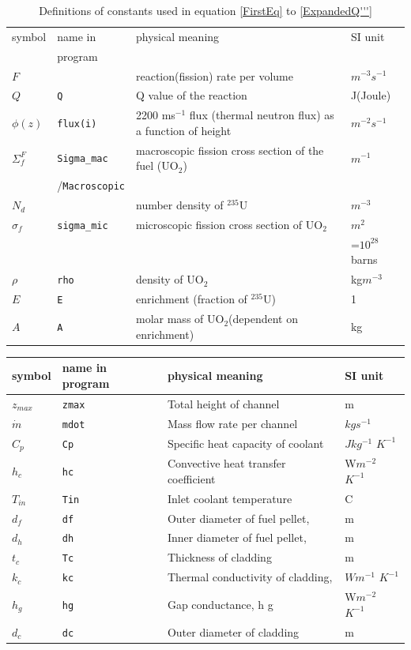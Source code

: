 \documentclass[a4paper, 12pt]{article}
\begin{document}
\newpage
\begin{appendices} 
	
\begin{table}[h!b]
\begin{tabular}{llll}
\hline
symbol&name in&physical meaning & SI unit\\
&program&&\\
\hline
\hline
$F$		&& reaction(fission) rate per volume							&$m^{-3}s^{-1}$\\
$Q$ 	&\texttt{Q}&Q value of the reaction 											&J(Joule)\\
$\phi(z)$&\texttt{flux(i)}& 2200 ms${}^{-1}$ flux (thermal neutron flux) as a function of height &$m^{-2}s^{-1}$\\
$\Sigma_f^F$&\texttt{Sigma\_mac}& macroscopic fission cross section of the fuel (UO${}_2$)		&$m^{-1}$\\
&/\texttt{Macroscopic}&&\\
$N_d$ 	&& number density of ${}^{235}$U 									&$m^{-3}$\\
$\sigma_f$&\texttt{sigma\_mic}& microscopic fission cross section of UO${}_2$	&$m^{2}$\\
&&&=$10^{28}$barns\\
$\rho $ &\texttt{rho}& density of UO${}_2$											&kg$m^{-3}$\\
$E$ 	&\texttt{E}& enrichment (fraction of ${}^{235}$U)								&1\\
$A$ 	&\texttt{A}& molar mass of UO${}_2$(dependent on enrichment)					&kg\\
\hline
\end{tabular}
\caption{Definitions of constants used in equation \ref{FirstEq} to \ref{ExpandedQ'''} }\label{table1}
\end{table}

\begin{table}[h!b]
\begin{tabular}{llll}

\hline
symbol&name in program&physical meaning & SI unit\\
\hline
$z_{max}$&\texttt{zmax}&Total height of channel 				&m\\
$\dot{m}$&\texttt{mdot}&Mass flow rate per channel 		&$kgs^{-1}$ \\
$C_p$	&\texttt{Cp}&Specific heat capacity of coolant 		&$Jkg^{-1}$ $K^{-1}$ \\
$h_c$	&\texttt{hc}&Convective heat transfer coefficient&W$m^{-2}$ $K^{-1}$ \\
$T_{in}$&\texttt{Tin}&Inlet coolant temperature 			& \textdegree C\\
\hline
$d_f$	&\texttt{df}&Outer diameter of fuel pellet, &m\\
$d_h$	&\texttt{dh}&Inner diameter of fuel pellet, &m\\
\hline
$t_c$	&\texttt{Tc}&Thickness of cladding &m\\
$k_c$	&\texttt{kc}&Thermal conductivity of cladding,  &$Wm^{-1}$ $K^{-1}$ \\
$h_g$	&\texttt{hg}&Gap conductance, h g &W$m^{-2}$ $K^{-1}$ \\
\hline
$d_c$	&\texttt{dc}&Outer diameter of cladding&m\\
\hline


\end{tabular}
\end{table}
\end{appendices}
\end{document}
